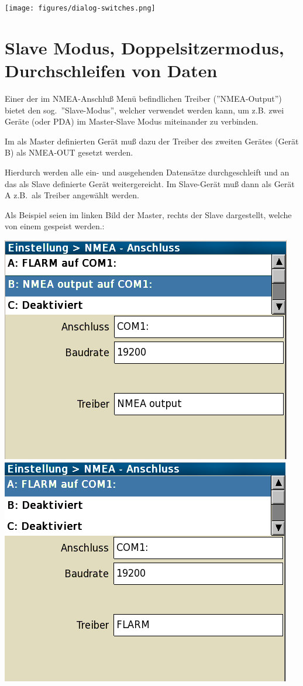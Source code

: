 \begin{center}
\texttt{[image: figures/dialog-switches.png]}
\end{center}
\section{Slave Modus, Doppelsitzermodus,  Durchschleifen von Daten}

Einer der im NMEA-Anschluß Menü befindlichen Treiber (''NMEA-Output'') bietet den sog.\  ''Slave-Modus'', welcher verwendet werden kann,  um z.B. zwei Geräte  (\al oder \textsf{PDA})  im Master-Slave Modus miteinander zu verbinden.  


Im als Master definierten Gerät muß dazu der Treiber des zweiten Gerätes  (Gerät B) als NMEA-OUT gesetzt werden.

Hierdurch werden alle ein- und ausgehenden Datensätze  durchgeschleift und an das als Slave definierte Gerät weitergereicht.
Im Slave-Gerät muß dann als Gerät A z.B.\ \fl als Treiber angewählt werden.

Als Beispiel seien im linken Bild der Master, rechts der Slave dargestellt, welche von einem \fl gespeist werden.:


\begin{center}%
\includegraphics[angle=0,width=0.45\linewidth,keepaspectratio='true']{figures/config-nmea-ms-master.png}~~~\includegraphics[angle=0,width=0.45\linewidth,keepaspectratio='true']{figures/config-nmea-ms-slave.png}
\end{center}

